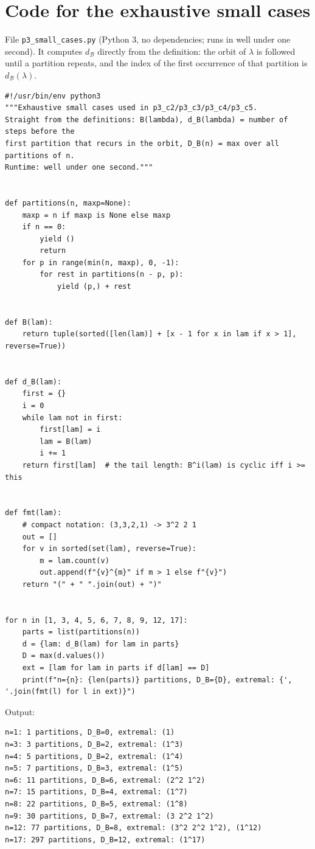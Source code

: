 \documentclass[11pt]{article}
\theoremstyle{definition}
\newcommand{\dB}{d_{\mathcal{B}}}
\begin{document}
\section{Code for the exhaustive small cases}\label{app:code}
File \texttt{p3\_small\_cases.py} (Python 3, no dependencies; runs in well under one second). It computes $\dB$ directly from the definition: the orbit of $\lambda$ is followed until a partition repeats, and the index of the first occurrence of that partition is $\dB(\lambda)$.
{\footnotesize
\begin{verbatim}
#!/usr/bin/env python3
"""Exhaustive small cases used in p3_c2/p3_c3/p3_c4/p3_c5.
Straight from the definitions: B(lambda), d_B(lambda) = number of steps before the
first partition that recurs in the orbit, D_B(n) = max over all partitions of n.
Runtime: well under one second."""


def partitions(n, maxp=None):
    maxp = n if maxp is None else maxp
    if n == 0:
        yield ()
        return
    for p in range(min(n, maxp), 0, -1):
        for rest in partitions(n - p, p):
            yield (p,) + rest


def B(lam):
    return tuple(sorted([len(lam)] + [x - 1 for x in lam if x > 1], reverse=True))


def d_B(lam):
    first = {}
    i = 0
    while lam not in first:
        first[lam] = i
        lam = B(lam)
        i += 1
    return first[lam]  # the tail length: B^i(lam) is cyclic iff i >= this


def fmt(lam):
    # compact notation: (3,3,2,1) -> 3^2 2 1
    out = []
    for v in sorted(set(lam), reverse=True):
        m = lam.count(v)
        out.append(f"{v}^{m}" if m > 1 else f"{v}")
    return "(" + " ".join(out) + ")"


for n in [1, 3, 4, 5, 6, 7, 8, 9, 12, 17]:
    parts = list(partitions(n))
    d = {lam: d_B(lam) for lam in parts}
    D = max(d.values())
    ext = [lam for lam in parts if d[lam] == D]
    print(f"n={n}: {len(parts)} partitions, D_B={D}, extremal: {', '.join(fmt(l) for l in ext)}")
\end{verbatim}
}
Output:
{\footnotesize
\begin{verbatim}
n=1: 1 partitions, D_B=0, extremal: (1)
n=3: 3 partitions, D_B=2, extremal: (1^3)
n=4: 5 partitions, D_B=2, extremal: (1^4)
n=5: 7 partitions, D_B=3, extremal: (1^5)
n=6: 11 partitions, D_B=6, extremal: (2^2 1^2)
n=7: 15 partitions, D_B=4, extremal: (1^7)
n=8: 22 partitions, D_B=5, extremal: (1^8)
n=9: 30 partitions, D_B=7, extremal: (3 2^2 1^2)
n=12: 77 partitions, D_B=8, extremal: (3^2 2^2 1^2), (1^12)
n=17: 297 partitions, D_B=12, extremal: (1^17)
\end{verbatim}
}
\end{document}
